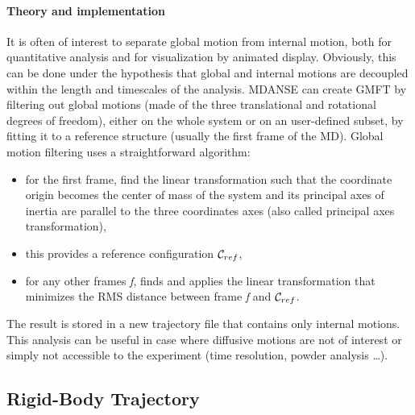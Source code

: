 \documentclass[a4paper,11pt]{article}
\begin{document}
\paragraph{Theory and implementation\\}
\label{gmft_theory}
It is often of interest to separate global motion from internal motion, both for quantitative analysis 
and for visualization by animated display. Obviously, this can be done under the hypothesis that global and internal 
motions are decoupled within the length and timescales of the analysis. \gls{MDANSE} can create \gls{GMFT} by filtering out global 
motions (made of the three translational and rotational degrees of freedom), either on the whole system or on an user-defined subset, 
by fitting it to a reference structure (usually the first frame of the \gls{MD}). Global motion filtering uses a straightforward 
algorithm:
\begin{itemize}
\item for the first frame, find the linear transformation such that the coordinate origin becomes the center of mass of 
the system and its principal axes of inertia are parallel to the three coordinates axes (also called principal axes 
transformation),
\item this provides a reference configuration ${\cal C}_{ref}$,
\item for any other frames \textit{f}, finds and applies the linear transformation that minimizes the RMS distance between 
frame \textit{f} and ${\cal C}_{ref}$.
\end{itemize} 
The result is stored in a new trajectory file that contains only internal motions. This analysis can be useful in case where diffusive 
motions are not of interest or simply not accessible to the experiment (time resolution, powder analysis \ldots).


\subsection{Rigid-Body Trajectory}
\label{rbt}
\end{document}
